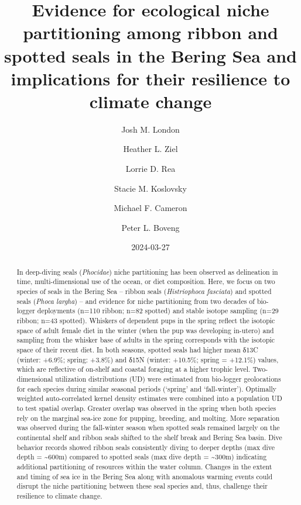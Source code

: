 \documentclass[
  letterpaper,
  DIV=11,
  numbers=noendperiod]{scrartcl}
\title{Evidence for ecological niche partitioning among ribbon and
spotted seals in the Bering Sea and implications for their resilience to
climate change}
\author{Josh M. London \and Heather L. Ziel \and Lorrie D.
Rea \and Stacie M. Koslovsky \and Michael F. Cameron \and Peter L.
Boveng}
\date{2024-03-27}
\begin{document}
\maketitle
\begin{abstract}
In deep-diving seals (\emph{Phocidae}) niche partitioning has been
observed as delineation in time, multi-dimensional use of the ocean, or
diet composition. Here, we focus on two species of seals in the Bering
Sea -- ribbon seals (\emph{Histriophoca fasciata}) and spotted seals
(\emph{Phoca largha}) -- and evidence for niche partitioning from two
decades of bio-logger deployments (n=110 ribbon; n=82 spotted) and
stable isotope sampling (n=29 ribbon; n=43 spotted). Whiskers of
dependent pups in the spring reflect the isotopic space of adult female
diet in the winter (when the pup was developing in-utero) and sampling
from the whisker base of adults in the spring corresponds with the
isotopic space of their recent diet. In both seasons, spotted seals had
higher mean δ13C (winter: +6.9\%; spring: +3.8\%) and δ15N (winter:
+10.5\%; spring = +12.1\%) values, which are reflective of on-shelf and
coastal foraging at a higher trophic level. Two-dimensional utilization
distributions (UD) were estimated from bio-logger geolocations for each
species during similar seasonal periods (`spring' and `fall-winter').
Optimally weighted auto-correlated kernel density estimates were
combined into a population UD to test spatial overlap. Greater overlap
was observed in the spring when both species rely on the marginal
sea-ice zone for pupping, breeding, and molting. More separation was
observed during the fall-winter season when spotted seals remained
largely on the continental shelf and ribbon seals shifted to the shelf
break and Bering Sea basin. Dive behavior records showed ribbon seals
consistently diving to deeper depths (max dive depth =
\textasciitilde600m) compared to spotted seals (max dive depth =
\textasciitilde300m) indicating additional partitioning of resources
within the water column. Changes in the extent and timing of sea ice in
the Bering Sea along with anomalous warming events could disrupt the
niche partitioning between these seal species and, thus, challenge their
resilience to climate change.

\begin{tcolorbox}[enhanced jigsaw, breakable, colbacktitle=quarto-callout-warning-color!10!white, colback=white, left=2mm, coltitle=black, opacityback=0, rightrule=.15mm, opacitybacktitle=0.6, arc=.35mm, toptitle=1mm, bottomrule=.15mm, titlerule=0mm, colframe=quarto-callout-warning-color-frame, leftrule=.75mm, bottomtitle=1mm, title={Under Development. Please do not cite or use}, toprule=.15mm]


\end{tcolorbox}
\end{abstract}
\end{document}
